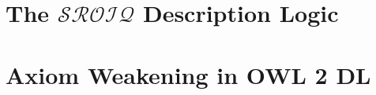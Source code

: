 \documentclass[10pt,a4paper]{report}
\theoremstyle{plain}
\theoremstyle{definition}
\theoremstyle{remark}
\begin{document}


\printbibliography

\appendix

\chapter{The \texorpdfstring{$\mathcal{SROIQ}$}{SROIQ} Description Logic} \label{sroiq-appendix}



\chapter{Axiom Weakening in OWL 2 DL} \label{weakening-owl-2-dl}


\end{document}
